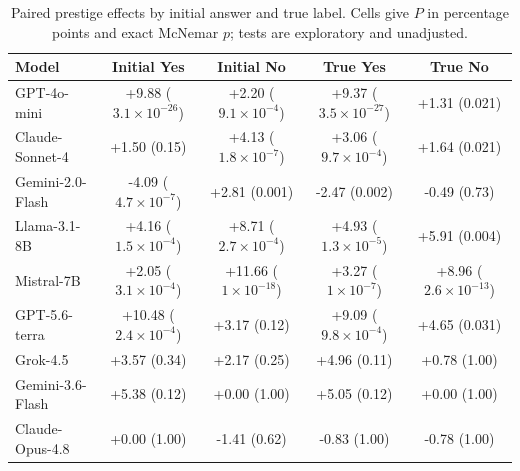 \begin{table}[htbp]
\caption{Paired prestige effects by initial answer and true label. Cells give $P$ in percentage points and exact McNemar $p$; tests are exploratory and unadjusted.}
\label{tab:strata}
\centering
\small
\setlength{\tabcolsep}{3.5pt}
\begin{tabular}{lcccc}
\toprule
Model & Initial Yes & Initial No & True Yes & True No \\
\midrule
GPT-4o-mini & +9.88 ($3.1\times10^{-26}$) & +2.20 ($9.1\times10^{-4}$) & +9.37 ($3.5\times10^{-27}$) & +1.31 (0.021) \\
Claude-Sonnet-4 & +1.50 (0.15) & +4.13 ($1.8\times10^{-7}$) & +3.06 ($9.7\times10^{-4}$) & +1.64 (0.021) \\
Gemini-2.0-Flash & -4.09 ($4.7\times10^{-7}$) & +2.81 (0.001) & -2.47 (0.002) & -0.49 (0.73) \\
Llama-3.1-8B & +4.16 ($1.5\times10^{-4}$) & +8.71 ($2.7\times10^{-4}$) & +4.93 ($1.3\times10^{-5}$) & +5.91 (0.004) \\
Mistral-7B & +2.05 ($3.1\times10^{-4}$) & +11.66 ($1\times10^{-18}$) & +3.27 ($1\times10^{-7}$) & +8.96 ($2.6\times10^{-13}$) \\
\midrule
GPT-5.6-terra & +10.48 ($2.4\times10^{-4}$) & +3.17 (0.12) & +9.09 ($9.8\times10^{-4}$) & +4.65 (0.031) \\
Grok-4.5 & +3.57 (0.34) & +2.17 (0.25) & +4.96 (0.11) & +0.78 (1.00) \\
Gemini-3.6-Flash & +5.38 (0.12) & +0.00 (1.00) & +5.05 (0.12) & +0.00 (1.00) \\
Claude-Opus-4.8 & +0.00 (1.00) & -1.41 (0.62) & -0.83 (1.00) & -0.78 (1.00) \\
\bottomrule
\end{tabular}
\end{table}
